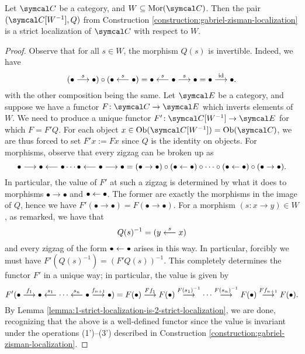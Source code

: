 \begin{theorem}
	Let \(\calC\) be a category, and \(W\subseteq\Mor(\calC)\). Then the pair \((\calC[W^{-1}],Q)\) from Construction \ref{construction:gabriel-zisman-localization} is a strict localization
	of \(\calC\) with respect to \(W\).
\end{theorem}
\begin{proof}
Observe that for all \(s\in W\), the morphism \(Q(s)\) is invertible. Indeed, we have
\[ (\bullet\overset{s}{\longrightarrow}\bullet)\circ(\bullet\overset{s}{\longleftarrow}\bullet) = \bullet\overset{s}{\longleftarrow}\bullet\overset{s}{\longrightarrow}\bullet = \bullet\overset{\mathrm{id}}{\longrightarrow}\bullet. \]
with the other composition being the same. Let \(\calE\) be a category, and suppose we have a functor \(F\!:\calC\to\calE\) which inverts elements of \(W\). We need
to produce a unique functor \(F'\!:\calC[W^{-1}]\to\calE\) for which \(F = F'Q\). For each object \(x\in\Ob(\calC[W^{-1}]) = \Ob(\calC)\), we are thus forced
to set \(F'x := Fx\) since \(Q\) is the identity on objects. For morphisms, observe that every zigzag can be broken up as
\[ \bullet \longrightarrow \bullet \longleftarrow \bullet \cdots \bullet \longleftarrow \bullet \longrightarrow \bullet = (\bullet\to \bullet)\circ(\bullet\leftarrow\bullet)\circ\cdots\circ(\bullet\leftarrow\bullet)\circ(\bullet\to\bullet). \]
In particular, the value of \(F'\) at such a zigzag is determined by what it does to morphisms \(\bullet\to\bullet\) and \(\bullet\leftarrow\bullet\). The former are exactly the morphisms
in the image of \(Q\), hence we have \(F'(\bullet\to\bullet) = F(\bullet\to\bullet)\). For a morphism \((s\!:x\to y)\in W\), as remarked, we have that
\[ Q(s)^{-1} = (y\overset{s}{\longleftarrow} x) \]
and every zigzag of the form \(\bullet\leftarrow\bullet\) arises in this way. In particular, forcibly we must have \(F'(Q(s)^{-1}) = (F'Q(s))^{-1}\). This completely determines the functor \(F'\)
in a unique way; in particular, the value is given by
\[ F'(\bullet \overset{f_1}{\longrightarrow} \bullet \overset{s_1}{\longleftarrow}  \cdots  \overset{s_n}{\longleftarrow} \bullet \overset{f_{n+1}}{\longrightarrow} \bullet)
 = F(\bullet) \overset{Ff_1}{\longrightarrow} F(\bullet) \overset{F(s_1)^{-1}}{\longrightarrow}  \cdots  \overset{F(s_n)^{-1}}{\longrightarrow} F(\bullet) \overset{Ff_{n+1}}{\longrightarrow} F(\bullet). \]
By Lemma \ref{lemma:1-strict-localization-is-2-strict-localization}, we are done, recognizing that the above is a well-defined functor since the value is invariant
under the operations (1')--(3') described in Construction \ref{construction:gabriel-zisman-localization}.
\end{proof}


